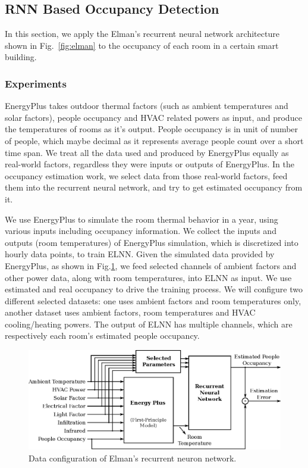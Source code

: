 \subsection{RNN Based Occupancy Detection}
\label{sec:rnn-method}

In this section, we apply the Elman's recurrent neural network architecture shown in
Fig.~\ref{fig:elman} to the occupancy of each room in a certain smart building.

\subsubsection{Experiments}
EnergyPlus takes outdoor thermal factors (such as ambient temperatures and solar
factors), people occupancy and HVAC related powers as input, and produce the
temperatures of rooms as it's output. People occupancy is in unit of number of
people, which maybe decimal as it represents average people count over a short
time span. We treat all the data used and produced by EnergyPlus equally as
real-world factors, regardless they were inputs or outputs of EnergyPlus. In the
occupancy estimation work, we select data from those real-world factors, feed
them into the recurrent neural network, and try to get estimated occupancy from
it.

We use EnergyPlus to simulate the room thermal behavior in a year, using various
inputs including occupancy information. We collect the inputs and outputs (room
temperatures) of EnergyPlus simulation, which is discretized into hourly data
points, to train ELNN. Given the simulated data
provided by EnergyPlus, as shown in Fig.\ref{fig:data-flow}, we feed selected
channels of ambient factors and other power data, along with room temperatures,
into ELNN as input. We use estimated and real
occupancy to drive the training process. We will configure two different
selected datasets: one uses ambient factors and room temperatures only, another
dataset uses ambient factors, room temperatures and HVAC cooling/heating
powers. The output of ELNN has multiple channels, which are
respectively each room's estimated people occupancy.

\begin{figure}[t]
    \centering
    \includegraphics[width=0.9\columnwidth]{figs/rnn/data-flow.eps}
    \caption{Data configuration of Elman's recurrent neuron network.}
    \label{fig:data-flow}
\end{figure}

